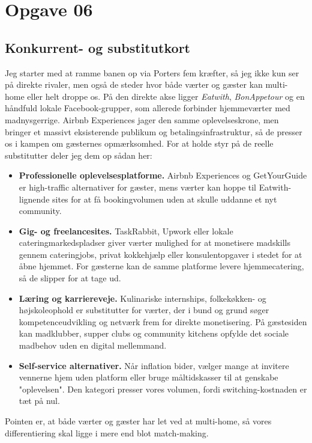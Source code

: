 \section*{Opgave 06}

\subsection*{Konkurrent- og substitutkort}
Jeg starter med at ramme banen op via Porters fem kræfter, så jeg ikke kun ser på direkte rivaler, men også de steder hvor både værter og gæster kan multi-home eller helt droppe os.\citep{Porter2008} På den direkte akse ligger \textit{Eatwith}, \textit{BonAppetour} og en håndfuld lokale Facebook-grupper, som allerede forbinder hjemmeværter med madnysgerrige. Airbnb Experiences jager den samme oplevelseskrone, men bringer et massivt eksisterende publikum og betalingsinfrastruktur, så de presser os i kampen om gæsternes opmærksomhed. For at holde styr på de reelle substitutter deler jeg dem op sådan her:
\begin{itemize}
  \item \textbf{Professionelle oplevelsesplatforme.} Airbnb Experiences og GetYourGuide er high-traffic alternativer for gæster, mens værter kan hoppe til Eatwith-lignende sites for at få bookingvolumen uden at skulle uddanne et nyt community.
  \item \textbf{Gig- og freelancesites.} TaskRabbit, Upwork eller lokale cateringmarkedspladser giver værter mulighed for at monetisere madskills gennem cateringjobs, privat kokkehjælp eller konsulentopgaver i stedet for at åbne hjemmet. For gæsterne kan de samme platforme levere hjemmecatering, så de slipper for at tage ud.
  \item \textbf{Læring og karriereveje.} Kulinariske internships, folkekøkken- og højskoleophold er substitutter for værter, der i bund og grund søger kompetenceudvikling og netværk frem for direkte monetisering. På gæstesiden kan madklubber, supper clubs og community kitchens opfylde det sociale madbehov uden en digital mellemmand.
  \item \textbf{Self-service alternativer.} Når inflation bider, vælger mange at invitere vennerne hjem uden platform eller bruge måltidskasser til at genskabe "oplevelsen". Den kategori presser vores volumen, fordi switching-kostnaden er tæt på nul.
\end{itemize}
Pointen er, at både værter og gæster har let ved at multi-home, så vores differentiering skal ligge i mere end blot match-making.

